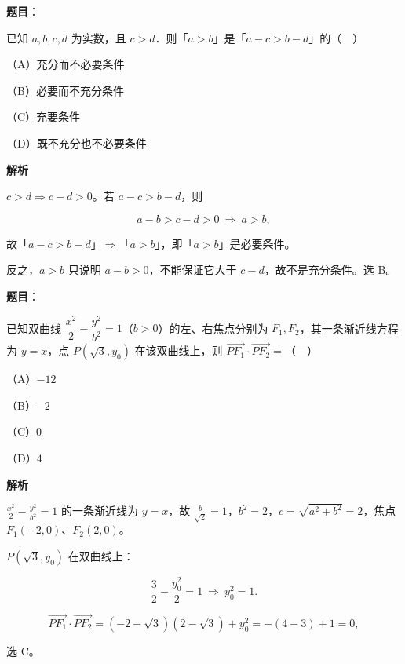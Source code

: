 \begin{answer}

\textbf{题目}：

已知 $a,b,c,d$ 为实数，且 $c>d$．则「$a>b$」是「$a-c>b-d$」的（　）

（A）充分而不必要条件

（B）必要而不充分条件

（C）充要条件

（D）既不充分也不必要条件

\textbf{解析}

$c>d\Rightarrow c-d>0$。若 $a-c>b-d$，则

\nopagebreak[4]
\[a-b>c-d>0\ \Longrightarrow\ a>b,\]

故「$a-c>b-d$」$\Rightarrow$「$a>b$」，即「$a>b$」是必要条件。

反之，$a>b$ 只说明 $a-b>0$，不能保证它大于 $c-d$，故不是充分条件。选 B。


\end{answer}
\begin{answer}

\textbf{题目}：

已知双曲线 $\dfrac{x^2}{2}-\dfrac{y^2}{b^2}=1$（$b>0$）的左、右焦点分别为 $F_1,F_2$，其一条渐近线方程为 $y=x$，点 $P(\sqrt3,y_0)$ 在该双曲线上，则 $\overrightarrow{PF_1}\cdot\overrightarrow{PF_2}=$（　）

（A）$-12$

（B）$-2$

（C）$0$

（D）$4$

\textbf{解析}

$\frac{x^2}{2}-\frac{y^2}{b^2}=1$ 的一条渐近线为 $y=x$，故 $\frac{b}{\sqrt2}=1$，$b^2=2$，$c=\sqrt{a^2+b^2}=2$，焦点 $F_1(-2,0)$、$F_2(2,0)$。

$P(\sqrt3,y_0)$ 在双曲线上：

\nopagebreak[4]
\[\frac32-\frac{y_0^2}{2}=1\ \Longrightarrow\ y_0^2=1 .\]

\nopagebreak[4]
\[\overrightarrow{PF_1}\cdot\overrightarrow{PF_2}
=(-2-\sqrt3)(2-\sqrt3)+y_0^2
=-(4-3)+1=0,\]

选 C。


\end{answer}
